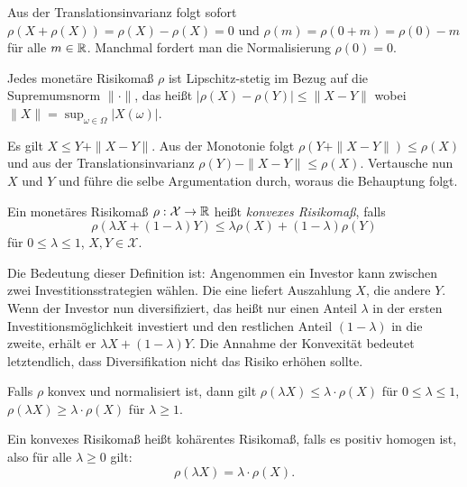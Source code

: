 \documentclass[a4paper,twoside,DIV15,BCOR12mm]{scrbook}
\newcommand{\cX}{\mathcal X}
\begin{document}
Aus der Translationsinvarianz folgt sofort $\rho(X + \rho(X)) = \rho(X) - \rho(X) = 0$ und $\rho(m) = \rho(0+m) = \rho(0) - m$ für alle $m\in\mathbb{R}$. Manchmal fordert man die Normalisierung $\rho(0)=0$.

\begin{satz}
Jedes monetäre Risikomaß $\rho$ ist Lipschitz-stetig im Bezug auf die Supremumsnorm $\|\cdot\|$, das heißt $|\rho(X) -\rho(Y)|\le \|X-Y\|$ wobei $\|X\| = \sup_{\omega\in\Omega}|X(\omega)|$. 
\end{satz}

\begin{beweis}
Es gilt $X\le Y+\|X-Y\|$. Aus der Monotonie folgt $\rho(Y+\|X-Y\|) \le \rho(X)$ und aus der Translationsinvarianz $\rho(Y)-\|X-Y\| \le \rho(X)$. Vertausche nun $X$ und $Y$ und führe die selbe Argumentation durch, woraus die Behauptung folgt.
\end{beweis}

\begin{definition}
Ein monetäres Risikomaß $\rho:\cX \to \MdR$ heißt \emph{konvexes Risikomaß}, falls 
\[
\rho(\lambda X + (1-\lambda)Y) \le \lambda \rho(X) + (1- \lambda)\rho(Y)
\]
für $0\le \lambda \le 1$, $X,Y\in\cX$.
\end{definition}

Die Bedeutung dieser Definition ist: Angenommen ein Investor kann zwischen zwei Investitionsstrategien wählen. Die eine liefert Auszahlung $X$, die andere $Y$. Wenn der Investor nun diversifiziert, das heißt nur einen Anteil $\lambda$ in der ersten Investitionsmöglichkeit investiert und den restlichen Anteil $(1-\lambda)$ in die zweite, erhält er $\lambda X + (1-\lambda)Y$. Die Annahme der Konvexität bedeutet letztendlich, dass Diversifikation nicht das Risiko erhöhen sollte.

Falls $\rho$ konvex und normalisiert ist, dann gilt $\rho(\lambda X)\leq \lambda \cdot \rho(X)$ für $0\leq\lambda\leq 1$, $\rho(\lambda X)\geq \lambda \cdot \rho(X)$ für $\lambda\geq 1$.

\begin{definition}
Ein konvexes Risikomaß heißt kohärentes Risikomaß, falls es positiv homogen ist, also für alle $\lambda\geq 0$ gilt: 
\[
\rho(\lambda X)=\lambda\cdot \rho (X).
\]
\end{definition}
\end{document}
